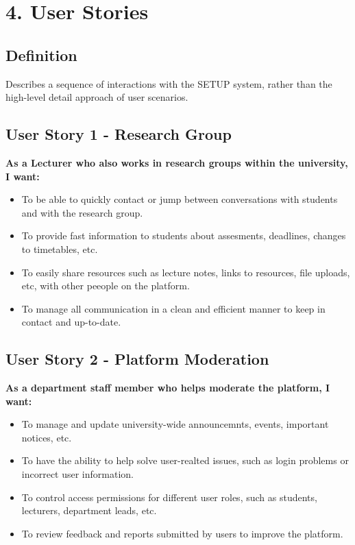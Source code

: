 \section*{4. User Stories}

\subsection*{Definition}
Describes a sequence of interactions with the SETUP system, rather than the high-level detail approach of user scenarios.

\subsection*{User Story 1 - Research Group}
\textbf{As a Lecturer who also works in research groups within the university, I want:}
\begin{itemize}
  \item To be able to quickly contact or jump between conversations with students and with the research group.
  \item To provide fast information to students about assesments, deadlines, changes to timetables, etc.
  \item To easily share resources such as lecture notes, links to resources,  file uploads, etc, with other peeople on the platform.
  \item To manage all communication in a clean and efficient manner to keep in contact and up-to-date.
\end{itemize}

\subsection*{User Story 2 - Platform Moderation}
\textbf{As a department staff member who helps moderate the platform, I want:}
\begin{itemize}
    \item To manage and update university-wide announcemnts, events, important notices, etc.
    \item To have the ability to help solve user-realted issues, such as login problems or incorrect user information.
    \item To control access permissions for different user roles, such as students, lecturers, department leads, etc.
    \item To review feedback and reports submitted by users to improve the platform.
\end{itemize}

